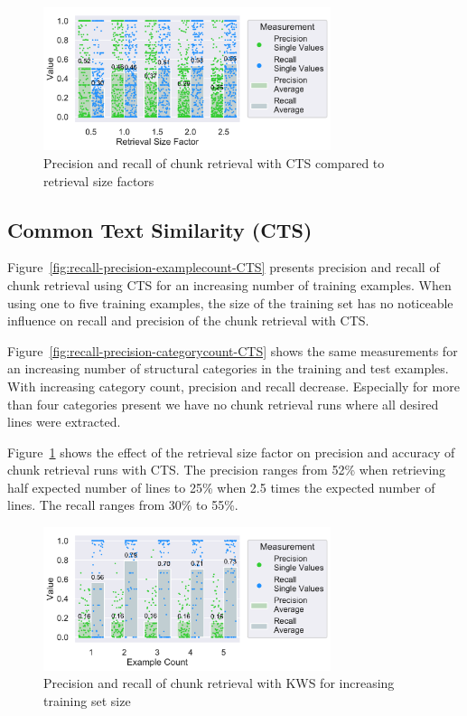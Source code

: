 \documentclass[\myrootdir/main.tex]{subfiles}
\begin{document}
\begin{figure}[htbp]
		\centering
		\includegraphics[width=0.75\textwidth, clip]{img/big-study/contextsizefactor-precision-recall-CTS.pdf}
		\caption{Precision and recall of chunk retrieval with CTS compared to retrieval size factors}
		\label{fig:contextsizefactor-precision-recall-CTS}
\end{figure}

\subsection{Common Text Similarity (CTS)}
Figure~\ref{fig:recall-precision-examplecount-CTS} presents precision and recall of chunk retrieval using CTS for an increasing number of training examples.
When using one to five training examples, the size of the training set has no noticeable influence on recall and precision of the chunk retrieval with CTS.

Figure~\ref{fig:recall-precision-categorycount-CTS} shows the same measurements for an increasing number of structural categories in the training and test examples.
With increasing category count, precision and recall decrease.
Especially for more than four categories present we have no chunk retrieval runs where all desired lines were extracted.

Figure~\ref{fig:contextsizefactor-precision-recall-CTS} shows the effect of the retrieval size factor on precision and accuracy of chunk retrieval runs with CTS\@.
The precision ranges from 52\% when retrieving half expected number of lines to 25\% when 2.5 times the expected number of lines.
The recall ranges from 30\% to 55\%.


\begin{figure}[htbp]
		\centering
		\includegraphics[width=0.75\textwidth, clip]{img/big-study/recall-precision-examplecount-KWS.pdf}
		\caption{Precision and recall of chunk retrieval with KWS for increasing training set size}
		\label{fig:recall-precision-examplecount-KWS}
\end{figure}
\end{document}

